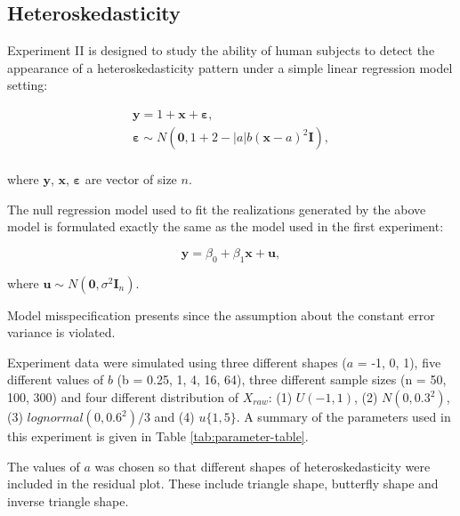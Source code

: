 \documentclass[]{interact}
\theoremstyle{plain}%
\theoremstyle{definition}
\theoremstyle{remark}
\begin{document}
\hypertarget{heteroskedasticity}{%
\subsection{Heteroskedasticity}\label{heteroskedasticity}}

Experiment II is designed to study the ability of human subjects to
detect the appearance of a heteroskedasticity pattern under a simple
linear regression model setting:

\begin{align} \label{eq:heter-model}
\boldsymbol{y} = 1 + \boldsymbol{x} + \boldsymbol{\varepsilon},\\
\boldsymbol{\varepsilon} \sim N(\boldsymbol{0}, 1 + 2 - |a| b (\boldsymbol{x} - a)^2 \boldsymbol{I}), \\
\end{align}

where \(\boldsymbol{y}\), \(\boldsymbol{x}\),
\(\boldsymbol{\varepsilon}\) are vector of size \(n\).

The null regression model used to fit the realizations generated by the
above model is formulated exactly the same as the model used in the
first experiment:

\begin{equation} 
\boldsymbol{y} = \beta_0 + \beta_1 \boldsymbol{x} + \boldsymbol{u},
\end{equation}

where
\(\boldsymbol{u} \sim N(\boldsymbol{0}, \sigma^2\boldsymbol{I}_n)\).

Model misspecification presents since the assumption about the constant
error variance is violated.

Experiment data were simulated using three different shapes (\(a\) = -1,
0, 1), five different values of \(b\) (b = 0.25, 1, 4, 16, 64), three
different sample sizes (n = 50, 100, 300) and four different
distribution of \(X_{raw}\): (1) \(U(-1, 1)\), (2) \(N(0, 0.3^2)\), (3)
\(lognormal(0, 0.6^2)/3\) and (4) \(u\{1, 5\}\). A summary of the
parameters used in this experiment is given in Table
\ref{tab:parameter-table}.

The values of \(a\) was chosen so that different shapes of
heteroskedasticity were included in the residual plot. These include
triangle shape, butterfly shape and inverse triangle shape.
\end{document}
